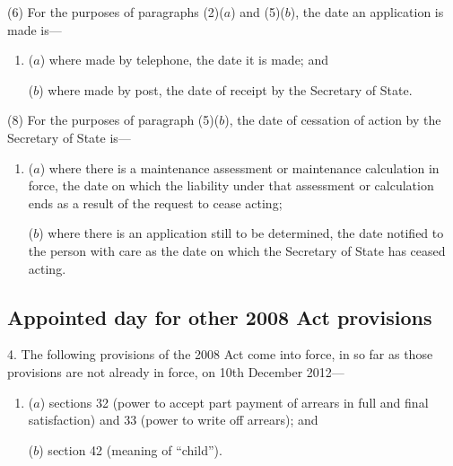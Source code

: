 \documentclass[12pt,a4paper]{article}
\begin{document}
(6) For the purposes of paragraphs (2)($a$)  and (5)($b$), the date an application is made is—
\begin{enumerate}\item[]
($a$) where made by telephone, the date it is made; and

($b$) where made by post, the date of receipt by the Secretary of State.
\end{enumerate}

%

(8) For the purposes of paragraph (5)($b$), the date of cessation of action by the Secretary of State is—
\begin{enumerate}\item[]
($a$) where there is a maintenance assessment or maintenance calculation in force, the date on which the liability under that assessment or calculation ends as a result of the request to cease acting;

($b$) where there is an application still to be determined, the date notified to the person with care as the date on which the Secretary of State has ceased acting.
\end{enumerate}


\subsection[4. Appointed day for other 2008 Act provisions]{Appointed day for other 2008 Act provisions}

4.  The following provisions of the 2008 Act come into force, in so far as those provisions are not already in force, on 10th December 2012—
\begin{enumerate}\item[]
($a$) sections 32 (power to accept part payment of arrears in full and final satisfaction) and 33 (power to write off arrears); and

($b$) section 42 (meaning of “child”).
\end{enumerate}
\end{document}
